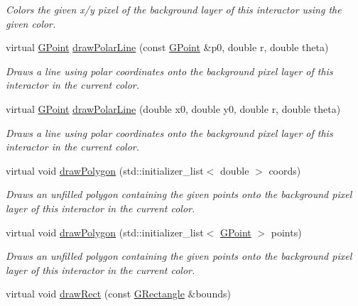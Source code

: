 \begin{DoxyCompactItemize}
\begin{DoxyCompactList}\small\item\em Colors the given x/y pixel of the background layer of this interactor using the given color. \end{DoxyCompactList}\item 
virtual \mbox{\hyperlink{structGPoint}{G\+Point}} \mbox{\hyperlink{classGDrawingSurface_af70cce1e4f708f1ed5b6f29cecb660e7}{draw\+Polar\+Line}} (const \mbox{\hyperlink{structGPoint}{G\+Point}} \&p0, double r, double theta)
\begin{DoxyCompactList}\small\item\em Draws a line using polar coordinates onto the background pixel layer of this interactor in the current color. \end{DoxyCompactList}\item 
virtual \mbox{\hyperlink{structGPoint}{G\+Point}} \mbox{\hyperlink{classGDrawingSurface_ad3e646f90005295f2bbdf37d2bcb39d2}{draw\+Polar\+Line}} (double x0, double y0, double r, double theta)
\begin{DoxyCompactList}\small\item\em Draws a line using polar coordinates onto the background pixel layer of this interactor in the current color. \end{DoxyCompactList}\item 
virtual void \mbox{\hyperlink{classGDrawingSurface_afddec0a905108d8a8d6809a157f26776}{draw\+Polygon}} (std\+::initializer\+\_\+list$<$ double $>$ coords)
\begin{DoxyCompactList}\small\item\em Draws an unfilled polygon containing the given points onto the background pixel layer of this interactor in the current color. \end{DoxyCompactList}\item 
virtual void \mbox{\hyperlink{classGDrawingSurface_a021ee881e0d154dc4dd059698742889c}{draw\+Polygon}} (std\+::initializer\+\_\+list$<$ \mbox{\hyperlink{structGPoint}{G\+Point}} $>$ points)
\begin{DoxyCompactList}\small\item\em Draws an unfilled polygon containing the given points onto the background pixel layer of this interactor in the current color. \end{DoxyCompactList}\item 
virtual void \mbox{\hyperlink{classGDrawingSurface_a3dd4cc5891149dfc36746264f7289877}{draw\+Rect}} (const \mbox{\hyperlink{structGRectangle}{G\+Rectangle}} \&bounds)

\end{DoxyCompactItemize}
